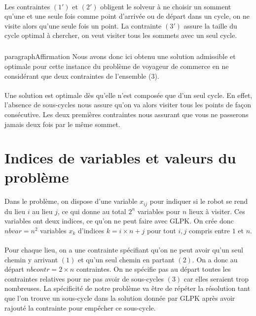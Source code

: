 \documentclass[a4paper,12pt]{article}
\begin{document}
\paragraph{}{
    Les contraintes $(1')$ et $(2')$ obligent le solveur à ne choisir un somment qu'une et une seule fois comme point d'arrivée ou de départ dans un cycle, on ne visite alors qu'une seule fois un point. La contrainte $(3')$ assure la taille du cycle optimal à chercher, on veut visiter tous les sommets avec un seul cycle. 
}

\subparagraph{}{}paragraph{Affirmation}{
	Nous avons donc ici obtenu une solution admissible et optimale pour cette instance du problème de voyageur de commerce en ne considérant que deux contraintes de l’ensemble (3).
}

\paragraph{}{
    Une solution est optimale dès qu'elle n'est composée que d'un seul cycle. En effet, l'absence de sous-cycles nous assure qu'on va alors visiter tous les points de façon consécutive. Les deux premières contraintes nous assurant que vous ne passerons jamais deux fois par le même sommet. 
}

\section{Indices de variables et valeurs du problème}

\paragraph{}{
    Dans le problème, on dispose d'une variable $x_{ij}$ pour indiquer si le robot se rend du lieu $i$ au lieu $j$, ce qui donne au total $2^n$ variables pour $n$ lieux à visiter. Ces variables ont deux indices, ce qu'on ne peut faire avec GLPK. On crée donc $nbvar = n^2$ variables $x_k$ d'indices $k = i \times n + j$ pour tout $i,j$ compris entre $1$ et $n$.
}

\paragraph{}{
    Pour chaque lieu, on a une contrainte spécifiant qu'on ne peut avoir qu'un seul chemin y arrivant $(1)$ et qu'un seul chemin en partant $(2)$. On a donc au départ $nbcontr=2 \times n$ contraintes. On ne spécifie pas au départ toutes les contraintes relatives pour ne pas avoir de sous-cycles $(3)$ car elles seraient trop nombreuses.\newline
    La spécificité de notre problème va être de répéter la résolution tant que l'on trouve un sous-cycle dans la solution donnée par GLPK après avoir rajouté la contrainte pour empêcher ce sous-cycle. 
}
\end{document}
